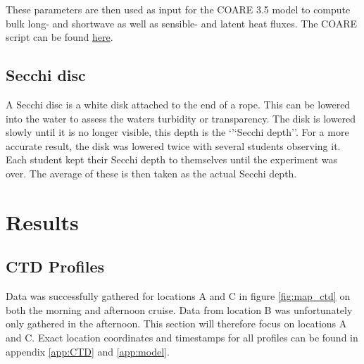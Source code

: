 \documentclass[a4paper,10pt,english]{article}
\begin{document}
These parameters are then used as input for the COARE 3.5 model to compute bulk long- and shortwave as well as sensible- and latent heat fluxes. The COARE script can be found \href{https://github.com/kaihc/GEO2320/blob/main/cruise/airsea_data.ipynb}{here}.

\subsection{Secchi disc}
A Secchi disc is a white disk attached to the end of a rope. This can be lowered into the water to assess the waters turbidity or transparency. The disk is lowered slowly until it is no longer visible, this depth is the `'`Secchi depth''. For a more accurate result, the disk was lowered twice with several students observing it. Each student kept their Secchi depth to themselves until the experiment was over. The average of these is then taken as the actual Secchi depth. 


\section{Results}\label{sec:results}
\setlength{\intextsep}{12pt}


\subsection{CTD Profiles}
Data was successfully gathered for locations A and C in figure \ref*{fig:map_ctd} on both the morning and afternoon cruise. Data from location B was unfortunately only gathered in the afternoon. This section will therefore focus on locations A and C. Exact location coordinates and timestamps for all profiles can be found in appendix \ref*{app:CTD} and \ref*{app:model}.
\end{document}
